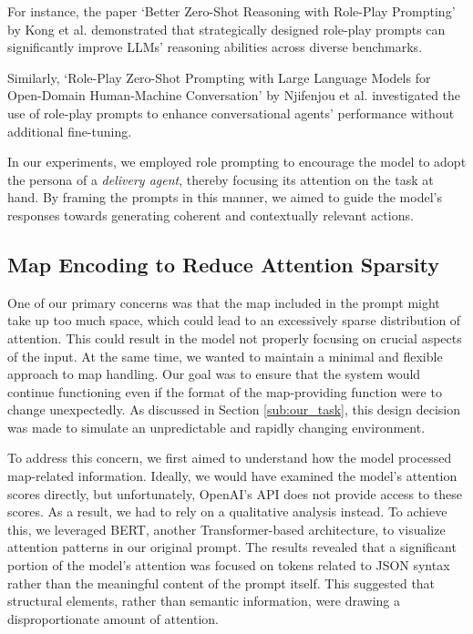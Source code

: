 For instance, the paper `Better Zero-Shot Reasoning with Role-Play Prompting' by
Kong et al. \cite{kong2024betterzeroshotreasoningroleplay} demonstrated that
strategically designed role-play prompts can significantly improve LLMs' reasoning
abilities across diverse benchmarks.

Similarly, `Role-Play Zero-Shot Prompting with Large Language Models for Open-Domain
Human-Machine Conversation' by Njifenjou et al. \cite{njifenjou2024roleplayzeroshotpromptinglarge}
investigated the use of role-play prompts to enhance conversational agents'
performance without additional fine-tuning.

In our experiments, we employed role prompting to encourage the model to adopt the
persona of a \emph{delivery agent}, thereby focusing its attention on the task at
hand. By framing the prompts in this manner, we aimed to guide the model's responses
towards generating coherent and contextually relevant actions.

\subsection{Map Encoding to Reduce Attention Sparsity}

One of our primary concerns was that the map included in the prompt might take
up too much space, which could lead to an excessively sparse distribution of attention.
This could result in the model not properly focusing on crucial aspects of the
input. At the same time, we wanted to maintain a minimal and flexible approach
to map handling. Our goal was to ensure that the system would continue functioning
even if the format of the map-providing function were to change unexpectedly. As
discussed in Section \ref{sub:our_task}, this design decision was made to simulate
an unpredictable and rapidly changing environment.

To address this concern, we first aimed to understand how the model processed
map-related information. Ideally, we would have examined the model’s attention
scores directly, but unfortunately, OpenAI’s API does not provide access to
these scores. As a result, we had to rely on a qualitative analysis instead. To achieve
this, we leveraged BERT, another Transformer-based architecture, to visualize
attention patterns in our original prompt. The results revealed that a significant
portion of the model’s attention was focused on tokens related to JSON syntax rather
than the meaningful content of the prompt itself. This suggested that structural
elements, rather than semantic information, were drawing a disproportionate
amount of attention.

